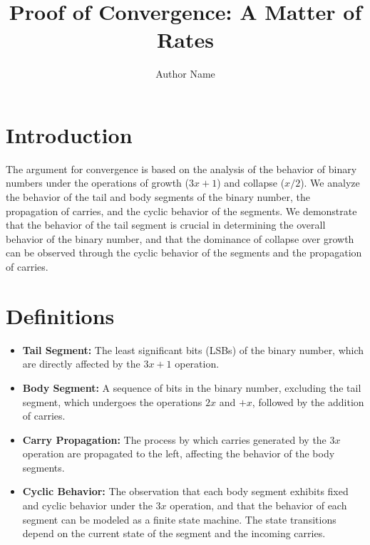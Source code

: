 \documentclass{article}
\begin{document}
\title{Proof of Convergence: A Matter of Rates}
\author{Author Name}
\date{}
\maketitle

\section{Introduction}
The argument for convergence is based on the analysis of the behavior of binary numbers under the operations of growth ($3x + 1$) and collapse ($x/2$). We analyze the behavior of the tail and body segments of the binary number, the propagation of carries, and the cyclic behavior of the segments. We demonstrate that the behavior of the tail segment is crucial in determining the overall behavior of the binary number, and that the dominance of collapse over growth can be observed through the cyclic behavior of the segments and the propagation of carries.

\section{Definitions}
\begin{itemize}
\item \textbf{Tail Segment:} The least significant bits (LSBs) of the binary number, which are directly affected by the $3x + 1$ operation.
\item \textbf{Body Segment:} A sequence of bits in the binary number, excluding the tail segment, which undergoes the operations $2x$ and $+x$, followed by the addition of carries.
\item \textbf{Carry Propagation:} The process by which carries generated by the $3x$ operation are propagated to the left, affecting the behavior of the body segments.
\item \textbf{Cyclic Behavior:} The observation that each body segment exhibits fixed and cyclic behavior under the $3x$ operation, and that the behavior of each segment can be modeled as a finite state machine. The state transitions depend on the current state of the segment and the incoming carries.
\end{itemize}
\end{document}
